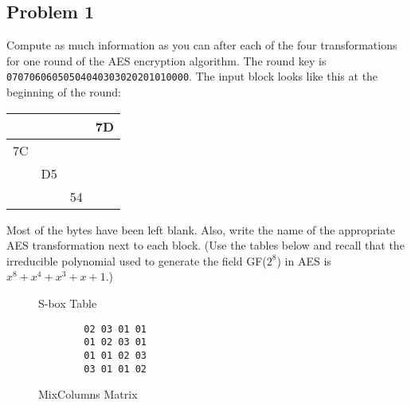 \documentclass[../hw_sols.tex]{subfiles}
\begin{document}
\newpage



\subsection*{Problem 1}

Compute as much information as you can after each of the four transformations 
for one round of the AES encryption algorithm. The round key is 
\verb|07070606050504040303020201010000|. The input block looks like this at 
the beginning of the round:

\begin{center}
\begin{tabular}{| c | c | c | c |}
	\hline
	   &    &    & 7D \\ \hline
	7C &    &    &    \\ \hline
	   & D5 &    &    \\ \hline
	   &    & 54 &    \\ \hline
\end{tabular}
\end{center}

Most of the bytes have been left blank. Also, write the name of the 
appropriate AES transformation next to each block. (Use the tables below and 
recall that the irreducible polynomial used to generate the field GF($2^8$) 
in AES is $x^8 + x^4 + x^3 + x + 1$.)

\begin{figure}[h]
\begin{minipage}{0.5\textwidth}
	\caption{S-box Table}
	\label{fig:sbox}
\end{minipage}
\hfill
\begin{minipage}{0.4\textwidth}
	\begin{verbatim}
        02 03 01 01
        01 02 03 01
        01 01 02 03
        03 01 01 02
	\end{verbatim}
	\caption{MixColumns Matrix}
	\label{fig:mixcols}
\end{minipage}
\end{figure}
\end{document}
